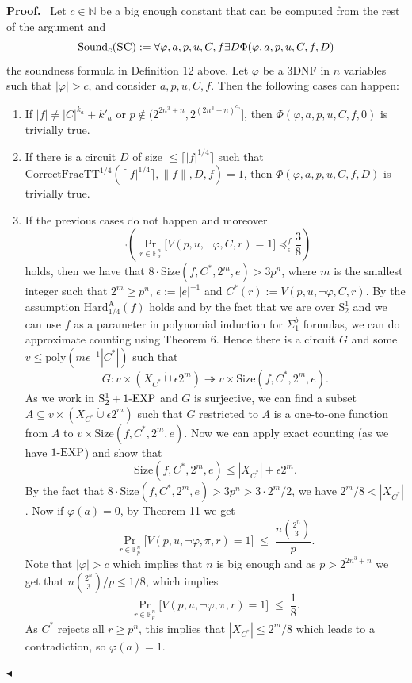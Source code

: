 \documentclass[11pt]{article}
\newcommand{\Stwo}{\mathrm{S}^{1}_{2}}
\newcommand{\oneEXP}{\textnormal{1-EXP}}
\newcommand{\SC}{\textsc{SC}}
\newcommand{\Fpn}{\mathbb{F}_{p}^{n}}
\newcommand{\N}{\mathbb{N}}
\newcommand{\Size}{\mathrm{Size}}
\newcommand{\HardA}{\mathrm{Hard}^{\mathrm{A}}}
\newcommand{\CFTT}{\mathrm{CorrectFracTT}}
\newcommand{\Snd}{\mathrm{Sound}}
\newcommand{\poly}{\mathrm{poly}}
\newcommand{\ceiling}[1]{\lceil #1 \rceil}
\newcommand{\dotcup}{\mathbin{\dot{\cup}}}
\newcommand{\twohead}{\twoheadrightarrow}
\newenvironment{authorproof}%
  {\par\medskip\noindent\textbf{Proof.}\ \ignorespaces}%
  {\unskip\par\nopagebreak\smallskip\noindent\hfill$\blacktriangleleft$\par\medskip}
\begin{document}
\begin{authorproof}
Let $c \in \N$ be a big enough constant that can be computed from the rest of the argument and
\[
  \Snd_{c}(\SC) := \forall\varphi,a,p,u,C,f\exists D\Phi(\varphi,a,p,u,C,f,D)
\]
the soundness formula in Definition 12 above. Let $\varphi$ be a 3DNF in $n$ variables such that
$|\varphi| > c$, and consider $a,p,u,C,f$. Then the following cases can happen:
\begin{enumerate}
\item[(a)] If $|f| \ne |C|^{k_{a}}+k'_{a}$ or $p \notin (2^{2n^{3}+n}, 2^{(2n^{3}+n)^{c_{p}}}]$,
  then $\Phi(\varphi,a,p,u,C,f,0)$ is trivially true.
\item[(b)] If there is a circuit $D$ of size $\le \ceiling{|f|^{1/4}}$ such that
  $\CFTT^{1/4}(\ceiling{|f|^{1/4}},\|f\|,D,f) = 1$, then $\Phi(\varphi,a,p,u,C,f,D)$ is trivially
  true.
\item[(c)] If the previous cases do not happen and moreover
\[
  \neg\left(\Pr_{r\in\Fpn}\bigl[V(p,u,\neg\varphi,C,r) = 1\bigr] \preceq^{f}_{\epsilon} \frac{3}{8}\right)
\]
  holds, then we have that $8 \cdot \Size(f,C^{*},2^{m},e) > 3p^{n}$, where $m$ is the smallest
  integer such that $2^{m} \ge p^{n}$, $\epsilon := |e|^{-1}$ and
  $C^{*}(r) := V(p,u,\neg\varphi,C,r)$. By the assumption $\HardA_{1/4}(f)$ holds and by the
  fact that we are over $\Stwo$ and we can use $f$ as a parameter in polynomial induction for
  $\Sigma^{b}_{1}$ formulas, we can do approximate counting using Theorem 6. Hence there is a
  circuit $G$ and some $v \le \poly(m\epsilon^{-1}|C^{*}|)$ such that
\[
  G : v \times (X_{C^{*}} \dotcup \epsilon 2^{m}) \twohead v \times \Size(f,C^{*},2^{m},e).
\]
  As we work in $\Stwo+\oneEXP$ and $G$ is surjective, we can find a subset
  $A \subseteq v \times (X_{C^{*}} \dotcup \epsilon 2^{m})$ such that $G$ restricted to $A$ is a
  one-to-one function from $A$ to $v \times \Size(f,C^{*},2^{m},e)$. Now we can apply exact
  counting (as we have $\oneEXP$) and show that
\[
  \Size(f,C^{*},2^{m},e) \le |X_{C^{*}}| + \epsilon 2^{m}.
\]
  By the fact that $8 \cdot \Size(f,C^{*},2^{m},e) > 3p^{n} > 3 \cdot 2^{m}/2$, we have
  $2^{m}/8 < |X_{C^{*}}|$. Now if $\varphi(a) = 0$, by Theorem 11 we get
\[
  \Pr_{r\in\Fpn}\bigl[V(p,u,\neg\varphi,\pi,r) = 1\bigr] \;\le\; \frac{n\binom{2^{n}}{3}}{p}.
\]
  Note that $|\varphi| > c$ which implies that $n$ is big enough and as $p > 2^{2n^{3}+n}$ we get
  that $n\binom{2^{n}}{3}/p \le 1/8$, which implies
\[
  \Pr_{r\in\Fpn}\bigl[V(p,u,\neg\varphi,\pi,r) = 1\bigr] \;\le\; \frac{1}{8}.
\]
  As $C^{*}$ rejects all $r \ge p^{n}$, this implies that $|X_{C^{*}}| \le 2^{m}/8$ which leads
  to a contradiction, so $\varphi(a) = 1$.
\end{enumerate}
\end{authorproof}
\end{document}
